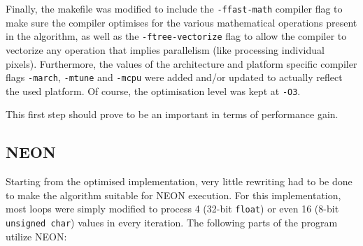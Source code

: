 \documentclass[final]{article}
\begin{document}
Finally, the makefile was modified to include the \texttt{-ffast-math} compiler flag to make sure the compiler optimises for the various mathematical operations present in the algorithm, as well as the \texttt{-ftree-vectorize} flag to allow the compiler to vectorize any operation that implies parallelism (like processing individual pixels).
Furthermore, the values of the architecture and platform specific compiler flags \texttt{-march}, \texttt{-mtune} and \texttt{-mcpu} were added and/or updated to actually reflect the used platform.
Of course, the optimisation level was kept at \texttt{-O3}.

This first step should prove to be an important in terms of performance gain.


\subsection{NEON}
Starting from the optimised implementation, very little rewriting had to be done to make the algorithm suitable for NEON execution.
For this implementation, most loops were simply modified to process 4 (32-bit \texttt{float}) or even 16 (8-bit \texttt{unsigned char}) values in every iteration.
The following parts of the program utilize NEON:
\end{document}
